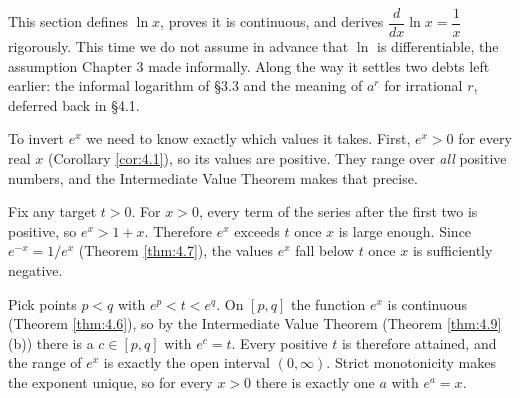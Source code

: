 \documentclass[a4paper,12pt,oneside]{memoir}
\begin{document}
This section defines \(\ln x\), proves it is continuous, and derives \(\dfrac{d}{dx}\ln x = \dfrac{1}{x}\) rigorously. This time we do not assume in advance that \(\ln\) is differentiable, the assumption Chapter 3 made informally. Along the way it settles two debts left earlier: the informal logarithm of §3.3 and the meaning of \(a^{r}\) for irrational \(r\), deferred back in §4.1.

To invert \(e^{x}\) we need to know exactly which values it takes. First, \(e^{x} > 0\) for every real \(x\) (Corollary \ref{cor:4.1}), so its values are positive. They range over \emph{all} positive numbers, and the Intermediate Value Theorem makes that precise.

Fix any target \(t > 0\). For \(x > 0\), every term of the series after the first two is positive, so \(e^{x} > 1 + x\). Therefore \(e^{x}\) exceeds \(t\) once \(x\) is large enough. Since \(e^{-x} = 1/e^{x}\) (Theorem \ref{thm:4.7}), the values \(e^{x}\) fall below \(t\) once \(x\) is sufficiently negative.

Pick points \(p < q\) with \(e^{p} < t < e^{q}\). On \([p, q]\) the function \(e^{x}\) is continuous (Theorem \ref{thm:4.6}), so by the Intermediate Value Theorem (Theorem \ref{thm:4.9}(b)) there is a \(c \in [p, q]\) with \(e^{c} = t\). Every positive \(t\) is therefore attained, and the range of \(e^{x}\) is exactly the open interval \((0, \infty)\). Strict monotonicity makes the exponent unique, so for every \(x > 0\) there is exactly one \(a\) with \(e^{a} = x\).
\end{document}
